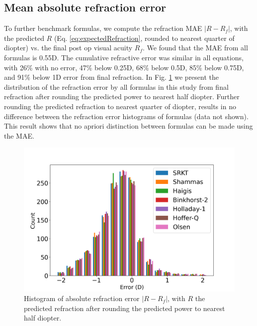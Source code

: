 \documentclass[article,twocolumn,preprint,10pt]{paper}%
\renewcommand{\(}{\left(}
\renewcommand{\)}{\right)}
\renewcommand{\[}{\left[}
\renewcommand{\]}{\right]}
\newcommand{\1}{\mbox{\boldmath$1$}}
\begin{document}
\subsection{Mean absolute refraction error}
To further benchmark formulas,  we compute the refraction MAE $|R-R_f|$, with the predicted $R$ (Eq. \ref{eq:expectedRefraction}, rounded to nearest quarter of diopter) vs.  the final post op visual acuity $R_f$.  We  found that the MAE from all formulas is 0.55D.  The cumulative refractive error was similar in all equations, with 26\% with no error, 47\% below 0.25D, 68\% below 0.5D, 85\% below 0.75D, and 91\% below 1D error from final refraction. In Fig. \ref{fig:histogramOfRefractionErrorFormulas} we present the distribution of the refraction error by all formulas in this study from final refraction after rounding the predicted power to nearest half diopter. Further rounding the predicted refraction to nearest quarter of diopter, results in no difference between the refraction error histograms of formulas (data not shown). This result shows that no apriori distinction between formulas can be made using the MAE.
\begin{figure} 
	\includegraphics[width=1\linewidth]{Histogram_RefractionError_Formulas}
	\caption{Histogram of absolute refraction error $|R-R_f|$, with $R$ the predicted refraction after rounding the predicted power to nearest half diopter.}
	\label{fig:histogramOfRefractionErrorFormulas}
\end{figure}
\end{document}
